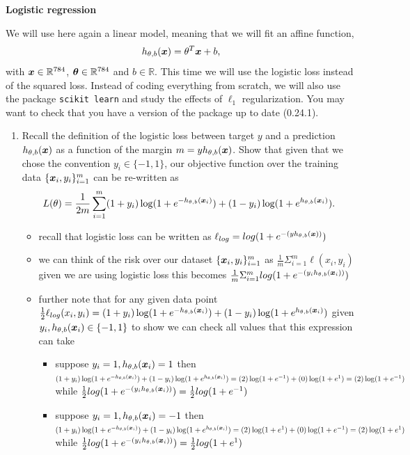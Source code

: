 \documentclass{article}
\begin{document}
{\color{nyupurple} \large \bf Logistic regression}  

We will use here again a linear model, meaning that we will fit an affine function,
\[
h_{\theta, b}(\boldsymbol{x}) = \theta^T\boldsymbol{x} + b,
\]
with $\boldsymbol{x} \in \mathbb{R}^{784}$, $\boldsymbol{\theta} \in \mathbb{R}^{784}$ and $b\in \mathbb{R}$.
This time we will use the logistic loss instead of the squared loss. Instead of coding everything from scratch, we will also use the package \texttt{scikit learn} and study the effects of $\ell_1$ regularization. You may want to check that you have a version of the package up to date (0.24.1).

\begin{enumerate}
\setcounter{enumi}{\value{saveenum}}
  \item Recall the definition of the logistic loss between target $y$ and a prediction $h_{\theta, b}(\boldsymbol{x})$ as a function of the margin $m = y h_{\theta, b}(\boldsymbol{x})$. Show that given that we chose the convention $y_i\in\{-1,1\}$, our objective function over the training data $\{\boldsymbol{x}_i, y_i\}_{i=1}^m$ can be re-written as
  \[
    L(\theta) = \frac 1 {2 m} \sum_{i=1}^m  (1 + y_i) \log ( 1 + e^{- h_{\theta, b}(\boldsymbol{x}_i)}) +  (1 - y_i) \log(1 + e^{h_{\theta, b}(\boldsymbol{x}_i)}).
    \]
\begin{itemize}
    \item recall that logistic loss can be written as $\ell_{log}=log(1+e^{-(y h_{\theta, b}(\boldsymbol{x}))})$
    \item we can think of the risk over our dataset $\{\boldsymbol{x}_i, y_i\}_{i=1}^m$ as $\frac{1}{m}\Sigma_{i=1}^{m}\ell(x_i,y_i)$ given we are using logistic loss this becomes $\frac{1}{m}\Sigma_{i=1}^{m} log(1+e^{-(y_i h_{\theta, b}(\boldsymbol{x}_i))})$
    \item further note that for any given data point $\frac 1 {2}\ell_{log}(x_i,y_i)=(1 + y_i) \log ( 1 + e^{- h_{\theta, b}(\boldsymbol{x}_i)}) +  (1 - y_i) \log(1 + e^{h_{\theta, b}(\boldsymbol{x}_i)})$ given $y_i,h_{\theta, b}(\boldsymbol{x}_i) \in \{-1,1\} $ to show we can check all values that this expression can take
    \begin{itemize}
        \item suppose $y_i=1,h_{\theta, b}(\boldsymbol{x}_i)=1$ then $(1 + y_i) \log ( 1 + e^{- h_{\theta, b}(\boldsymbol{x}_i)}) +  (1 - y_i) \log(1 + e^{h_{\theta, b}(\boldsymbol{x}_i)})=(2) \log ( 1 + e^{-1}) +  (0) \log(1 + e^{1})=(2) \log ( 1 + e^{-1})$ while   $\frac{1}{2}log(1+e^{-(y_i h_{\theta, b}(\boldsymbol{x}_i))})=\frac{1}{2}log(1+e^{-1})$
        \item suppose $y_i=1,h_{\theta, b}(\boldsymbol{x}_i)=-1$ then $(1 + y_i) \log ( 1 + e^{- h_{\theta, b}(\boldsymbol{x}_i)}) +  (1 - y_i) \log(1 + e^{h_{\theta, b}(\boldsymbol{x}_i)})=(2) \log ( 1 + e^{1}) +  (0) \log(1 + e^{-1})=(2) \log ( 1 + e^{1})$ while   $\frac{1}{2}log(1+e^{-(y_i h_{\theta, b}(\boldsymbol{x}_i))})=\frac{1}{2}log(1+e^{1})$

\end{itemize}
\end{itemize}
\end{enumerate}
\end{document}
